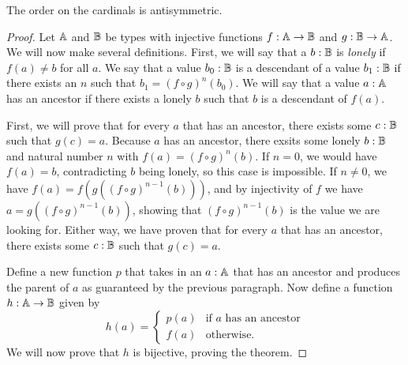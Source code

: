 \documentclass[../../math.tex]{subfiles}
\begin{document}
\begin{instance}
    The order on the cardinals is antisymmetric.
\end{instance}
\begin{proof}
    Let $\mathbb{A}$ and $\mathbb{B}$ be types with injective functions $f : \mathbb{A} \to \mathbb{B}$ and $g :
    \mathbb{B} \to \mathbb{A}$.  We will now make several definitions.  First, we will say that
    a $b : \mathbb{B}$ is \textit{lonely} if $f(a) \neq b$ for all $a$.  We say that a
    value $b_0 : \mathbb{B}$ is a descendant of a value $b_1 : \mathbb{B}$ if there exists an
    $n$ such that $b_1 = (f \circ g)^n(b_0)$.  We will say that a value $a : \mathbb{A}$
    has an ancestor if there exists a lonely $b$ such that $b$ is a descendant
    of $f(a)$.

    First, we will prove that for every $a$ that has an ancestor, there exists
    some $c : \mathbb{B}$ such that $g(c) = a$.  Because $a$ has an ancestor, there
    exsits some lonely $b : \mathbb{B}$ and natural number $n$ with $f(a) = (f \circ
    g)^n(b)$.  If $n = 0$, we would have $f(a) = b$, contradicting $b$ being
    lonely, so this case is impossible.  If $n \neq 0$, we have $f(a) = f(g((f
    \circ g)^{n-1}(b)))$, and by injectivity of $f$ we have $a = g((f \circ
    g)^{n-1}(b))$, showing that $(f \circ g)^{n-1}(b)$ is the value we are
    looking for.  Either way, we have proven that for every $a$ that has an
    ancestor, there exists some $c : \mathbb{B}$ such that $g(c) = a$.

    Define a new function $p$ that takes in an $a : \mathbb{A}$ that has an ancestor and
    produces the parent of $a$ as guaranteed by the previous paragraph.  Now
    define a function $h : \mathbb{A} \to \mathbb{B}$ given by
    \[
        h(a) = \begin{cases}
            p(a) &\text{if $a$ has an ancestor} \\
            f(a) &\text{otherwise.}
        \end{cases}
    \]
    We will now prove that $h$ is bijective, proving the theorem.


\end{proof}
\end{document}
